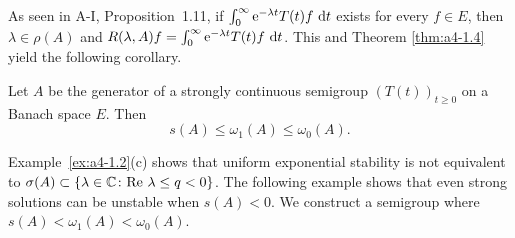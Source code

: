 As seen in A-I, Proposition~1.11, if $\int_0^\infty \mathrm{e}^{-\lambda t} T(t) f \,\mathop{}\!\mathrm{d}{t}$ exists for every $f \in E$, then $\lambda \in \rho(A)$ and $R(\lambda, A) f = \int_0^\infty \mathrm{e}^{-\lambda t} T(t) f \,\mathop{}\!\mathrm{d}{t}$. 
This and Theorem \ref{thm:a4-1.4} yield the following corollary.
\begin{corollary} \label{cor:a4-1.5} Let $ A $ be the generator of a strongly continuous semigroup $ (T(t))_{t \geq 0} $ on a Banach space $ E $. 
Then  
\[
s(A) \leq \omega_1(A) \leq \omega_{0}(A).
\]
\end{corollary}
Example~\ref{ex:a4-1.2}(c) shows that uniform exponential stability is not equivalent to $ \sigma(A) \subset \{\lambda \in \mathbb{C}\colon\text{Re } \lambda \leq q < 0 \} $. 
The following example shows that even strong solutions can be unstable when $ s(A) < 0 $. We construct a semigroup where $ s(A) < \omega_1(A) < \omega_{0}(A) $.

